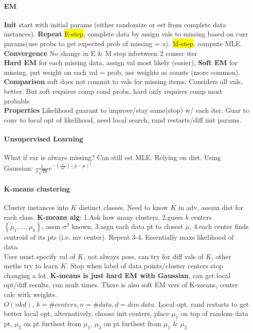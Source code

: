 \paragraph{EM} \textbf{Init} start with initial params (either
randomize or est from complete data instances). \textbf{Repeat}
\colorbox{yellow}{E-step}, complete data by assign vals to missing
based on curr
params(use probs to get expected prob of missing = x). \colorbox{yellow}{M-step}, compute MLE. \textbf{Convergence}
No change in E \& M step inbetween 2 consec iter
\\ \textbf{Hard EM} for each missing data, assign val most likely
(easier), \textbf{Soft EM} for missing, put weight on each val = prob,
use weights as counts (more common). \textbf{Comparison} soft does not
commit to vals for missing items. Considers all vals, better. But soft
requires comp cond probs, hard only requires comp most probable
\\ \textbf{Properties} Likelihood guarant to improve/stay same(stop) w/ each
iter. Guar to conv to local opt of likelihood, need local search, rand
restarts/diff init params. 
\\ \paragraph{Unsupervised Learning} What if var is always missing?
Can still est MLE. Relying on dist. Using Gaussian:
$\frac{1}{\sigma\sqrt{2\pi}}e^{-\left(\frac{1}{2\sigma^2}\right)(y-\mu)^2}$
\paragraph{K-means clustering} Cluster instances into $K$ distinct
classes. Need to know $K$ in adv, assum dist for each
class. \textbf{K-means alg}: 1.Ask how many clusters, 2.guess $k$ centers
$\left\{\mu_1,\ldots,\mu_k\right\}$, assm $\sigma^2$ known, 3.asgn each
data pt to closest $\mu$, 4.each center finds centroid of its pts
(i.e. mv center). Repeat 3-4. Essentially maxs likelihood of data.
\\ User must specify val of $K$, not
always poss, can try for diff vals of $K$, other meths try to learn
$K$. Stop when label of data points/cluster centers stop changing a
lot. \textbf{K-means is just hard EM with Gaussian}, can get local
opt/diff results, run mult times. There is also
soft EM vers of K-means, center calc with weights.
\\ $O(nkd)$, $k=\#centers, n=\#data,d=dim\ data$. Local opt. rand restarts to get better local opt, alternatively, choose
init centers, place $\mu_1$ on top of random data pt, $\mu_2$ on pt
furthest from $\mu_1$, $\mu_3$ on pt furthest from $\mu_1$ \& $\mu_2$
